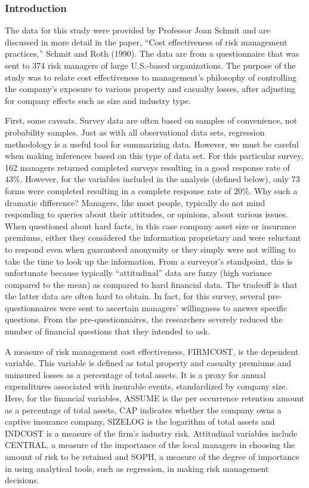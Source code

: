 \subsubsection*{Introduction}


The data for this study were provided by Professor Joan Schmit and
are discussed in more detail in the paper, ``Cost effectiveness of
risk management practices,'' Schmit and Roth (1990). The data are
from a questionnaire that was sent to 374 risk managers of large
U.S.-based organizations. The purpose of the study was to relate
cost effectiveness to management's philosophy of controlling the
company's exposure to various property and casualty losses, after
adjusting for company effects such as size and industry type.

First, some caveats. Survey data are often based on samples of
convenience, not probability samples. Just as with all observational
data sets, regression methodology is a useful tool for summarizing
data. However, we must be careful when making inferences based on
this type of data set. For this particular survey, 162 managers
returned completed surveys resulting in a good response rate of
$43\%$. However, for the variables included in the analysis (defined
below), only 73 forms were completed resulting in a complete
response rate of $20\%$. Why such a dramatic difference? Managers,
like most people, typically do not mind responding to queries about
their attitudes, or opinions, about various issues. When questioned
about hard facts, in this case company asset size or insurance
premiums, either they considered the information proprietary and
were reluctant to respond even when guaranteed anonymity or they
simply were not willing to take the time to look up the information.
From a surveyor's standpoint, this is unfortunate because typically
``attitudinal'' data are fuzzy (high variance compared to the mean)
as compared to hard financial data. The tradeoff is that the latter
data are often hard to obtain. In fact, for this survey, several
pre-questionnaires were sent to ascertain managers' willingness to
answer specific questions. From the pre-questionnaires, the
researchers severely reduced the number of financial questions that
they intended to ask.

A measure of risk management cost effectiveness, FIRMCOST, is the
dependent variable. This variable is defined as total property and
casualty premiums and uninsured losses as a percentage of total
assets. It is a proxy for annual expenditures associated with
insurable events, standardized by company size. Here, for the
financial variables, ASSUME is the per occurrence retention amount
as a percentage of total assets, CAP indicates whether the company
owns a captive insurance company, SIZELOG is the logarithm of total
assets and INDCOST is a measure of the firm's industry risk.
Attitudinal variables include CENTRAL, a measure of the importance
of the local managers in choosing the amount of risk to be retained
and SOPH, a measure of the degree of importance in using analytical
tools, such as regression, in making risk management decisions.

